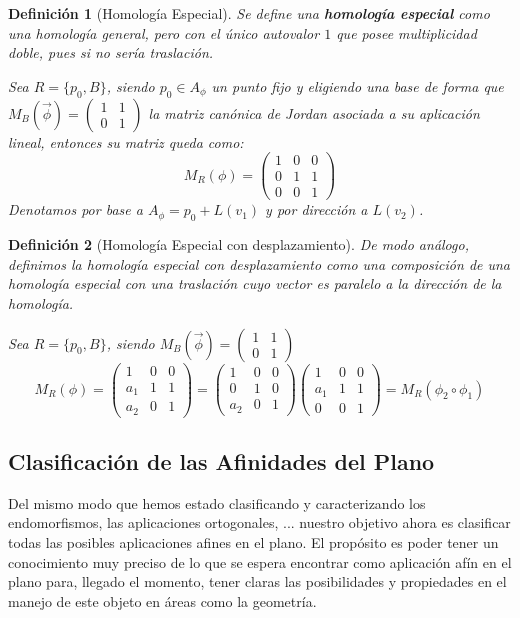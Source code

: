 \documentclass[10pt,a4paper,openright]{book}
\theoremstyle{break}
\newtheorem*{defi}{Definición}
\begin{document}
\begin{defi}[Homología Especial]
Se define una \textbf{homología especial} como una homología general, pero con el único autovalor $1$ que posee multiplicidad doble, pues si no sería traslación.

Sea $R = \{p_0 , B\}$, siendo $p_0 \in A_\phi$ un punto fijo y eligiendo una base de forma que $M_B (\vec{\phi}) = \begin{pmatrix} 1 & 1   \\ 0 & 1  \end{pmatrix} $ la matriz canónica de Jordan asociada a su aplicación lineal, entonces su matriz queda como:
$$M_R (\phi) = \left(\begin{array}{c|cc}
1  & 0 & 0 \\
\hline
0 & 1 &  1 \\
0 & 0 &  1
\end{array}
\right)$$
Denotamos por base a $A_\phi = p_0 + L(v_1)$ y por dirección a $L(v_2)$.
\end{defi}

\begin{defi}[Homología Especial con desplazamiento]
De modo análogo, definimos la homología especial con desplazamiento como una composición de una homología especial con una traslación cuyo vector es paralelo a la dirección de la homología.

Sea $R = \{p_0 , B\}$, siendo $M_B (\vec{\phi}) = \begin{pmatrix} 1 & 1   \\ 0 & 1  \end{pmatrix} $
$$M_R (\phi) = \left(\begin{array}{c|cc}
1  & 0 & 0 \\
\hline
a_1 & 1 &  1 \\
a_2 & 0 &  1
\end{array}
\right) = \left(\begin{array}{c|cc}
1  & 0 & 0 \\
\hline
0 & 1 &  0 \\
a_2 & 0 &  1
\end{array}
\right)\left(\begin{array}{c|cc}
1  & 0 & 0 \\
\hline
a_1 & 1 &  1 \\
0 & 0 &  1
\end{array}
\right) = M_R (\phi_2 \circ \phi_1)$$
\end{defi}

\subsection{Clasificación de las Afinidades del Plano}
Del mismo modo que hemos estado clasificando y caracterizando los endomorfismos, las aplicaciones ortogonales, ... nuestro objetivo ahora es clasificar todas las posibles aplicaciones afines en el plano. El propósito es poder tener un conocimiento muy preciso de lo que se espera encontrar como aplicación afín en el plano para, llegado el momento, tener claras las posibilidades y propiedades en el manejo de este objeto en áreas como la geometría.
\end{document}
